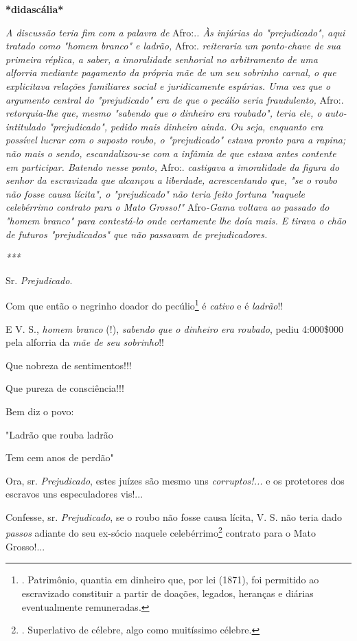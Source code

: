 \textbf{*didascália*}

\emph{A discussão teria fim com a palavra de} Afro:.\emph{. Às injúrias
do "prejudicado", aqui tratado como "homem branco" e ladrão,} Afro:.
\emph{reiteraria um ponto-chave de sua primeira réplica, a saber, a
imoralidade senhorial no arbitramento de uma alforria mediante pagamento
da própria mãe de um seu sobrinho carnal, o que explicitava relações
familiares social e juridicamente espúrias. Uma vez que o argumento
central do "prejudicado" era de que o pecúlio seria fraudulento,} Afro:.
\emph{retorquia-lhe que, mesmo "sabendo que o dinheiro era roubado",
teria ele, o auto-intitulado "prejudicado", pedido mais dinheiro ainda.
Ou seja, enquanto era possível lucrar com o suposto roubo, o
"prejudicado" estava pronto para a rapina; não mais o sendo,
escandalizou-se com a infâmia de que estava antes contente em
participar. Batendo nesse ponto,} Afro:. \emph{castigava a imoralidade
da figura do senhor da escravizada que alcançou a liberdade,
acrescentando que, "se o roubo não fosse causa lícita", o "prejudicado"
não teria feito fortuna "naquele celebérrimo contrato para o Mato
Grosso!"} Afro\emph{-Gama voltava ao passado do "homem branco" para
contestá-lo onde certamente lhe doía mais. E tirava o chão de futuros
"prejudicados" que não passavam de prejudicadores.}

\emph{***}

Sr. \emph{Prejudicado}.

Com que então o negrinho doador do pecúlio\footnote{. Patrimônio,
  quantia em dinheiro que, por lei (1871), foi permitido ao escravizado
  constituir a partir de doações, legados, heranças e diárias
  eventualmente remuneradas.} é \emph{cativo} e é \emph{ladrão}!!

E V. S., \emph{homem branco} (!), \emph{sabendo que o dinheiro era
roubado}, pediu 4:000\$000 pela alforria da \emph{mãe de seu sobrinho}!!

Que nobreza de sentimentos!!!

Que pureza de consciência!!!

Bem diz o povo:

"Ladrão que rouba ladrão

Tem cem anos de perdão"

Ora, sr. \emph{Prejudicado}, estes juízes são mesmo uns
\emph{corruptos!...} e os protetores dos escravos uns especuladores
vis!...

Confesse, sr. \emph{Prejudicado}, se o roubo não fosse causa lícita, V.
S. não teria dado \emph{passos} adiante do seu ex-sócio naquele
celebérrimo\footnote{. Superlativo de célebre, algo como muitíssimo
  célebre.} contrat\protect\hypertarget{Secao_Sem_Titulo-41}{}{}o para o
Mato Grosso!...

